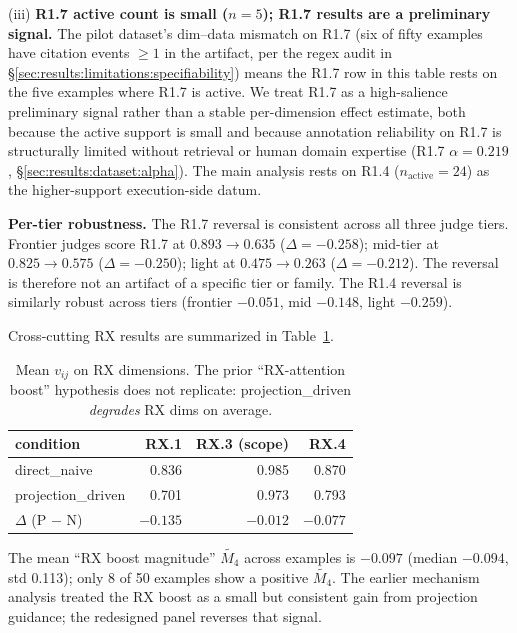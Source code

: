 (iii) \textbf{R1.7 active count is small ($n = 5$); R1.7 results are a preliminary signal.} The pilot dataset's dim--data mismatch on R1.7 (six of fifty examples have citation events $\geq 1$ in the artifact, per the regex audit in \S\ref{sec:results:limitations:specifiability}) means the R1.7 row in this table rests on the five examples where R1.7 is active. We treat R1.7 as a high-salience preliminary signal rather than a stable per-dimension effect estimate, both because the active support is small and because annotation reliability on R1.7 is structurally limited without retrieval or human domain expertise (R1.7 $\alpha = 0.219$, \S\ref{sec:results:dataset:alpha}). The main analysis rests on R1.4 ($n_{\text{active}} = 24$) as the higher-support execution-side datum.

\textbf{Per-tier robustness.} The R1.7 reversal is consistent across all three judge tiers. Frontier judges score R1.7 at $0.893 \to 0.635$ ($\Delta = -0.258$); mid-tier at $0.825 \to 0.575$ ($\Delta = -0.250$); light at $0.475 \to 0.263$ ($\Delta = -0.212$). The reversal is therefore not an artifact of a specific tier or family. The R1.4 reversal is similarly robust across tiers (frontier $-0.051$, mid $-0.148$, light $-0.259$).

Cross-cutting RX results are summarized in Table~\ref{tab:exp2_rx}.

\begin{table}[t]
\centering
\caption{Mean $v_{ij}$ on RX dimensions. The prior ``RX-attention boost'' hypothesis does not replicate: projection\_driven \emph{degrades} RX dims on average.}
\label{tab:exp2_rx}
\begin{tabular}{lrrr}
\toprule
\textbf{condition} & \textbf{RX.1} & \textbf{RX.3 (scope)} & \textbf{RX.4} \\
\midrule
direct\_naive       & \cellcolor{HMGood}0.836 & \cellcolor{HMGood}0.985 & \cellcolor{HMGood}0.870 \\
projection\_driven  & \cellcolor{HMHigh}0.701 & \cellcolor{HMBackground}0.973 & \cellcolor{HMMid}0.793 \\
$\Delta$ (P $-$ N)  & \cellcolor{HMHigh}$\mathbf{-0.135}$ & \cellcolor{HMBackground}$-0.012$ & \cellcolor{HMMid}$-0.077$ \\
\bottomrule
\end{tabular}
\end{table}

The mean ``RX boost magnitude'' $\widetilde{M_4}$ across examples is $-0.097$ (median $-0.094$, std 0.113); only 8 of 50 examples show a positive $\widetilde{M_4}$. The earlier mechanism analysis treated the RX boost as a small but consistent gain from projection guidance; the redesigned panel reverses that signal.


